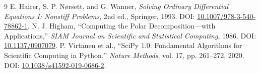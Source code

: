 \begin{thebibliography}{9}
E. Hairer, S. P. N\o rsett, and G. Wanner,
\emph{Solving Ordinary Differential Equations I: Nonstiff Problems},
2nd ed., Springer, 1993. DOI: \href{https://doi.org/10.1007/978-3-540-78862-1}{10.1007/978-3-540-78862-1}.
N. J. Higham, ``Computing the Polar Decomposition---with Applications,''
\emph{SIAM Journal on Scientific and Statistical Computing}, 1986.
DOI: \href{https://doi.org/10.1137/0907079}{10.1137/0907079}.
P. Virtanen et al., ``SciPy 1.0: Fundamental Algorithms for Scientific Computing in Python,''
\emph{Nature Methods}, vol. 17, pp. 261--272, 2020.
DOI: \href{https://doi.org/10.1038/s41592-019-0686-2}{10.1038/s41592-019-0686-2}.
\end{thebibliography}
